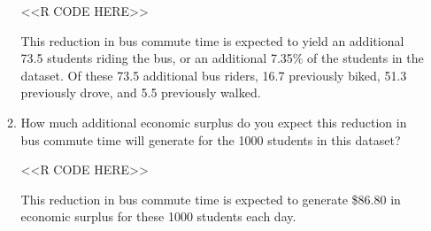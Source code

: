 \documentclass[11pt,letterpaper]{article}
\begin{document}
\begin{enumerate}[label=\alph*., leftmargin=*]
\begin{enumerate}[label=\roman*.]
		<<R CODE HERE>>

		This reduction in bus commute time is expected to yield an additional 73.5 students riding the bus, or an additional 7.35\% of the students in the dataset. Of these 73.5 additional bus riders, 16.7 previously biked, 51.3 previously drove, and 5.5 previously walked.

		\item How much additional economic surplus do you expect this reduction in bus commute time will generate for the 1000 students in this dataset?

		<<R CODE HERE>>

		This reduction in bus commute time is expected to generate \$86.80 in economic surplus for these 1000 students each day.
	\end{enumerate}

\end{enumerate}
\end{document}
